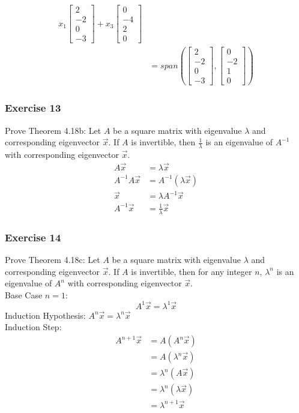 \documentclass{math}
\begin{document}
\begin{align*}
    x_1\begin{bmatrix}2 \\ -2 \\ 0 \\ -3\end{bmatrix}+
    x_3\begin{bmatrix}0 \\ -4 \\ 2 \\ 0\end{bmatrix} \\
  &= span\left(\begin{bmatrix}2 \\ -2 \\ 0 \\ -3\end{bmatrix},
    \begin{bmatrix}0 \\ -2 \\ 1 \\ 0\end{bmatrix}\right)
\end{align*}

\subsubsection*{Exercise 13}
Prove Theorem 4.18b: Let \( A \) be a square matrix with eigenvalue
\( \lambda \) and corresponding eigenvector \( \vec{x} \). If \( A \) is
invertible, then \( \frac{1}{\lambda} \) is an eigenvalue of \( A^{-1} \) with
corresponding eigenvector \( \vec{x} \).
\begin{align*}
  A\vec{x} &= \lambda\vec{x} \\
  A^{-1}A\vec{x} &= A^{-1}(\lambda\vec{x}) \\
  \vec{x} &= \lambda A^{-1}\vec{x} \\
  A^{-1}\vec{x} &= \frac{1}{\lambda}\vec{x}
\end{align*}

\subsubsection*{Exercise 14}
Prove Theorem 4.18c: Let \( A \) be a square matrix with eigenvalue
\( \lambda \) and corresponding eigenvector \( \vec{x} \). If \( A \) is
invertible, then for any integer \( n \), \( \lambda^n \) is an eigenvalue of
\( A^n \) with corresponding eigenvector \( \vec{x} \). \\
Base Case \( n = 1 \): \\
\[ A^1\vec{x} = \lambda^1\vec{x} \]
Induction Hypothesis: \( A^n\vec{x} = \lambda^n\vec{x} \) \\
Induction Step:
\begin{align*}
  A^{n+1}\vec{x} &= A(A^n\vec{x}) \\
  &= A(\lambda^n\vec{x}) \\
  &= \lambda^n(A\vec{x}) \\
  &= \lambda^n(\lambda\vec{x}) \\
  &= \lambda^{n+1}\vec{x}
\end{align*}
\end{document}

